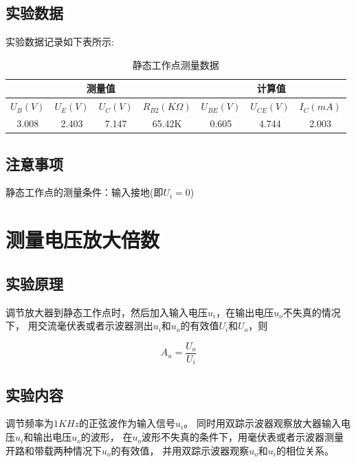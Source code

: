 \documentclass[a4paper]{article}
\begin{document}
    \subsection{实验数据}\label{subsec:3}
    {{实验数据记录如下表所示:}}

    \begin{table}[htbp]
        \centering
        \caption{静态工作点测量数据}
        \begin{tabular}{|c|c|c|c|c|c|c|}
            \hline
            \multicolumn{4}{|c|}{测量值} & \multicolumn{3}{|c|}{计算值} \\
            \hline
            $U_B(V)$ & $U_E(V)$ & $U_C(V)$ & $R_{B2}(K\Omega)$ & $U_{BE}(V)$ & $U_{CE}(V)$ & $I_C(mA)$ \\
            \hline
            3.008    & 2.403    & 7.147    & 65.42K            & 0.605       & 4.744       & 2.003     \\
            \hline
        \end{tabular}\label{tab:table2}
    \end{table}

    \subsection{注意事项}\label{subsec:4}
    {{静态工作点的测量条件：输入接地(即$U_i=0$)}}


    \vspace{1cm}


    \section{测量电压放大倍数}\label{sec:4}

    \subsection{实验原理}\label{subsec:5}
    {{调节放大器到静态工作点时，然后加入输入电压$u_i$，在输出电压$u_o$不失真的情况下，
    用交流毫伏表或者示波器测出$u_i$和$u_o$的有效值$U_i$和$U_o$，则}}

    \begin{equation}
        A_u=\frac{U_o}{U_i}\label{eq:equation3}
    \end{equation}

    \subsection{实验内容}\label{subsec:6}
    {{调节频率为$1KHz$的正弦波作为输入信号$u_i$。
    同时用双踪示波器观察放大器输入电压$u_i$和输出电压$u_o$的波形，
    在$u_o$波形不失真的条件下，用毫伏表或者示波器测量开路和带载两种情况下$u_o$的有效值，
    并用双踪示波器观察$u_o$和$u_i$的相位关系。}}
\end{document}
